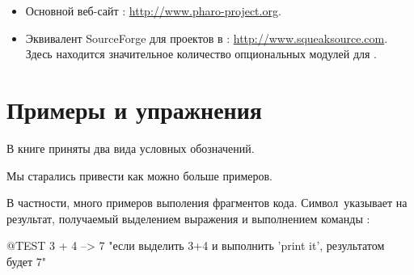 \documentclass[a4paper,10pt,twoside]{book}
\begin{document}
\begin{itemize}

\item Основной веб-сайт \pharo: \url{http://www.pharo-project.org}.


\item Эквивалент SourceForge для проектов в \pharo: \url{http://www.squeaksource.com}.
Здесь находится значительное количество опциональных модулей для \pharo.
\end{itemize}

\section*{Примеры и упражнения}

В книге приняты два вида условных обозначений.

Мы старались привести как можно больше примеров.


В частности, много примеров выполения фрагментов кода. Символ\,\ct{-->} указывает на результат, получаемый выделением выражения и выполнением команды :

\begin{code}{@TEST}
3 + 4 --> 7    "если выделить 3+4 и выполнить 'print it', результатом будет 7"
\end{code}

\end{document}
